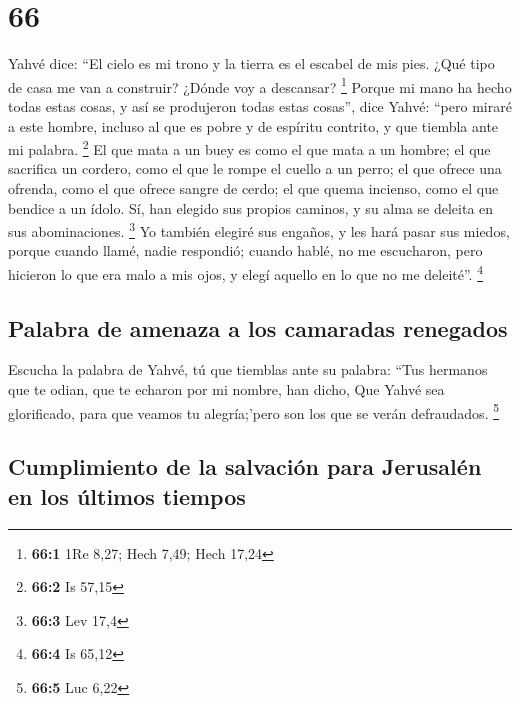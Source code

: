\hypertarget{section-65}{%
\section{66}\label{section-65}}

 Yahvé dice: ``El cielo es mi trono y la tierra es el
escabel de mis pies. ¿Qué tipo de casa me van a construir? ¿Dónde voy a
descansar? \footnote{\textbf{66:1} 1Re 8,27; Hech 7,49; Hech 17,24}
 Porque mi mano ha hecho todas estas cosas, y así se
produjeron todas estas cosas'', dice Yahvé: ``pero miraré a este hombre,
incluso al que es pobre y de espíritu contrito, y que tiembla ante mi
palabra. \footnote{\textbf{66:2} Is 57,15}  El que mata a
un buey es como el que mata a un hombre; el que sacrifica un cordero,
como el que le rompe el cuello a un perro; el que ofrece una ofrenda,
como el que ofrece sangre de cerdo; el que quema incienso, como el que
bendice a un ídolo. Sí, han elegido sus propios caminos, y su alma se
deleita en sus abominaciones. \footnote{\textbf{66:3} Lev 17,4}
 Yo también elegiré sus engaños, y les hará pasar sus
miedos, porque cuando llamé, nadie respondió; cuando hablé, no me
escucharon, pero hicieron lo que era malo a mis ojos, y elegí aquello en
lo que no me deleité''. \footnote{\textbf{66:4} Is 65,12}

\hypertarget{palabra-de-amenaza-a-los-camaradas-renegados}{%
\subsection{Palabra de amenaza a los camaradas
renegados}\label{palabra-de-amenaza-a-los-camaradas-renegados}}

 Escucha la palabra de Yahvé, tú que tiemblas ante su
palabra: ``Tus hermanos que te odian, que te echaron por mi nombre, han
dicho, Que Yahvé sea glorificado, para que veamos tu alegría;'pero son
los que se verán defraudados. \footnote{\textbf{66:5} Luc 6,22}

\hypertarget{cumplimiento-de-la-salvaciuxf3n-para-jerusaluxe9n-en-los-uxfaltimos-tiempos}{%
\subsection{Cumplimiento de la salvación para Jerusalén en los últimos
tiempos}\label{cumplimiento-de-la-salvaciuxf3n-para-jerusaluxe9n-en-los-uxfaltimos-tiempos}}

